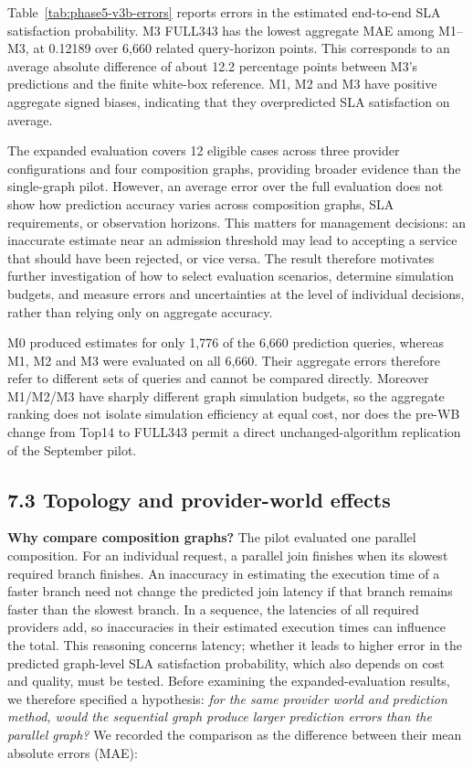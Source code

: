 \documentclass[10pt,a4paper]{article}
\begin{document}
Table~\ref{tab:phase5-v3b-errors} reports errors in the estimated end-to-end SLA satisfaction probability. M3 FULL343 has the lowest aggregate MAE among M1--M3, at 0.12189 over 6,660 related query-horizon points. This corresponds to an average absolute difference of about 12.2 percentage points between M3's predictions and the finite white-box reference. M1, M2 and M3 have positive aggregate signed biases, indicating that they overpredicted SLA satisfaction on average.

The expanded evaluation covers 12 eligible cases across three provider configurations and four composition graphs, providing broader evidence than the single-graph pilot. However, an average error over the full evaluation does not show how prediction accuracy varies across composition graphs, SLA requirements, or observation horizons. This matters for management decisions: an inaccurate estimate near an admission threshold may lead to accepting a service that should have been rejected, or vice versa. The result therefore motivates further investigation of how to select evaluation scenarios, determine simulation budgets, and measure errors and uncertainties at the level of individual decisions, rather than relying only on aggregate accuracy.

M0 produced estimates for only 1,776 of the 6,660 prediction queries, whereas M1, M2 and M3 were evaluated on all 6,660. Their aggregate errors therefore refer to different sets of queries and cannot be compared directly. Moreover M1/M2/M3 have sharply different graph simulation budgets, so the aggregate ranking does not isolate simulation efficiency at equal cost, nor does the pre-WB change from Top14 to FULL343 permit a direct unchanged-algorithm replication of the September pilot.

\subsection*{7.3 Topology and provider-world effects}

\textbf{Why compare composition graphs?} The pilot evaluated one parallel composition. For an individual request, a parallel join finishes when its slowest required branch finishes. An inaccuracy in estimating the execution time of a faster branch need not change the predicted join latency if that branch remains faster than the slowest branch. In a sequence, the latencies of all required providers add, so inaccuracies in their estimated execution times can influence the total. This reasoning concerns latency; whether it leads to higher error in the predicted graph-level SLA satisfaction probability, which also depends on cost and quality, must be tested. Before examining the expanded-evaluation results, we therefore specified a hypothesis: \emph{for the same provider world and prediction method, would the sequential graph produce larger prediction errors than the parallel graph?} We recorded the comparison as the difference between their mean absolute errors (MAE):
\end{document}
